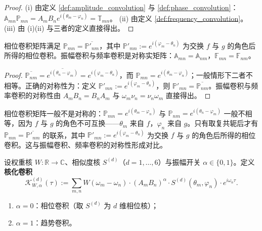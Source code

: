 \begin{proof}
(i) 由定义 \ref{def:amplitude_convolution} 与 \ref{def:phase_convolution}：$\mathbb{A}_{mn}\mathbb{P}_{mn} = A_m B_n e^{i(\theta_m - \varphi_n)} = \mathbb{T}_{mn}$。
(ii) 由定义 \ref{def:frequency_convolution}。
(iii) 由 (i)(ii) 与三者的定义直接得出。
\end{proof}

\begin{proposition}[相位卷积的共轭对称性]\label{prop:phase_convolution_symmetry}
相位卷积矩阵满足 $\mathbb{P}_{mn} = \overline{\mathbb{P}'_{nm}}$，其中 $\mathbb{P}'_{mn} := e^{i(\varphi_m - \theta_n)}$ 为交换 $f$ 与 $g$ 的角色后所得的相位卷积。振幅卷积与频率卷积是对称实矩阵：$\mathbb{A}_{mn} = \mathbb{A}_{nm}$，$\mathbb{F}_{mn} = \mathbb{F}_{nm}$。
\end{proposition}

\begin{proof}
$\overline{\mathbb{P}_{nm}} = \overline{e^{i(\theta_n - \varphi_m)}} = e^{i(\varphi_m - \theta_n)}$，而 $\mathbb{P}_{mn} = e^{i(\theta_m - \varphi_n)}$；一般情形下二者不相等。正确的对称性为：定义 $\mathbb{P}'_{mn} := e^{i(\varphi_m - \theta_n)}$，则 $\mathbb{P}'_{mn} = \overline{\mathbb{P}_{nm}}$。振幅卷积与频率卷积的对称性由 $A_m B_n = B_n A_m$ 与 $\omega_m \nu_n = \nu_n \omega_m$ 直接得出。
\end{proof}

\begin{remark}[相位卷积的非对称性]\label{rem:phase_convolution_asymmetry}
相位卷积矩阵一般不是对称的：$\mathbb{P}_{mn} = e^{i(\theta_m - \varphi_n)}$ 与 $\mathbb{P}_{nm} = e^{i(\theta_n - \varphi_m)}$ 一般不相等，因为 $f$ 与 $g$ 的角色不可互换——$\theta_m$ 来自 $f$，$\varphi_n$ 来自 $g$。只有取复共轭后才有 $\mathbb{P}_{mn} = \overline{\mathbb{P}'_{nm}}$ 的联系，其中 $\mathbb{P}'_{mn} := e^{i(\varphi_m - \theta_n)}$ 为交换 $f$ 与 $g$ 的角色后所得的相位卷积。这与振幅卷积、频率卷积的对称性形成对比。
\end{remark}

\begin{definition}\label{def:kernelized_convolution}
设权重核 $W: \mathbb{R} \to \mathbb{C}$、相似度核 $S^{(d)}$（$d = 1,\dots,6$）与振幅开关 $\alpha \in \{0, 1\}$。定义\textbf{核化卷积}
\[
\mathcal{K}^{(d)}_{W,\alpha}(\tau) := \sum_{m,n} W(\omega_m - \omega_n) \cdot (A_m B_n)^{\alpha} \cdot S^{(d)}(\theta_m, \varphi_n) \cdot e^{i\omega_n \tau}.
\]
\begin{enumerate}[label=(\roman*)]
    \item $\alpha = 0$：相位卷积（取 $S^{(d)}$ 为 $d$ 维相位核）；
    \item $\alpha = 1$：趋势卷积。
\end{enumerate}
\end{definition}

